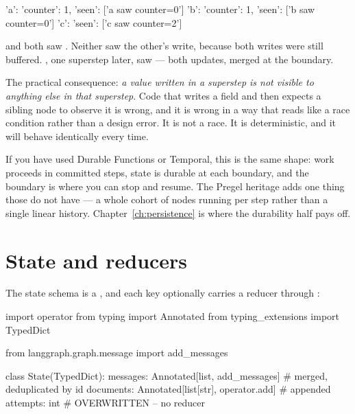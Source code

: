 \begin{console}
{'a': {'counter': 1, 'seen': ['a saw counter=0']}}
{'b': {'counter': 1, 'seen': ['b saw counter=0']}}
{'c': {'seen': ['c saw counter=2']}}
\end{console}

 and  both saw . Neither saw the other's write,
because both writes were still buffered. , one superstep later, saw
 --- both updates, merged at the boundary.

\begin{warning}
The practical consequence: \emph{a value written in a superstep is not visible to
anything else in that superstep}. Code that writes a field and then expects a
sibling node to observe it is wrong, and it is wrong in a way that reads like a
race condition rather than a design error. It is not a race. It is deterministic,
and it will behave identically every time.
\end{warning}

\begin{dotnetbox}
If you have used Durable Functions or Temporal, this is the same shape: work
proceeds in committed steps, state is durable at each boundary, and the boundary
is where you can stop and resume. The Pregel heritage adds one thing those do not
have --- a whole cohort of nodes running per step rather than a single linear
history. Chapter~\ref{ch:persistence} is where the durability half pays off.
\end{dotnetbox}

\section{State and reducers}
\label{sec:state-reducers}

The state schema is a , and each key optionally carries a reducer
through :

\begin{python}[caption={A state schema, annotated}, label={lst:state-schema}]
import operator
from typing import Annotated
from typing_extensions import TypedDict

from langgraph.graph.message import add_messages


class State(TypedDict):
    messages: Annotated[list, add_messages]        # merged, deduplicated by id
    documents: Annotated[list[str], operator.add]  # appended
    attempts: int                                  # OVERWRITTEN -- no reducer
\end{python}


